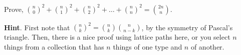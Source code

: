\documentclass{book}
\begin{document}
\setcounter{cpjt}{101}
\addtocounter{cpjt}{-1}
\begin{activity}\label{activity-94}
\hypertarget{p-708}{}%
Prove, \(\binom{n}{0}^{2} + \binom{n}{1}^{2} + \binom{n}{2}^{2} + \ldots + \binom{n}{n}^{2} = \binom{2n}{n}\).%
\par\smallskip%
\noindent\textbf{Hint}.\hypertarget{hint-55}{}\quad%
\hypertarget{p-709}{}%
First note that \(\binom{n}{k}^2 = \binom{n}{k}\binom{n}{n-k}\), by the symmetry of Pascal's triangle.  Then, there is a nice proof using lattice paths here, or you select \(n\) things from a collection that has \(n\) things of one type and \(n\) of another.%
\par\smallskip%
\noindent\end{activity}

\clearpage
\end{document}
